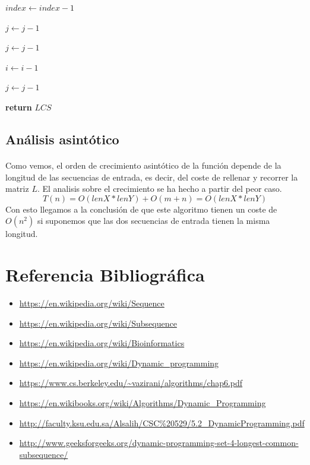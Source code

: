 \documentclass{article}
\begin{document}
\begin{algorithm}[H]
\begin{algorithmic}[1]
						\State $index\gets index - 1$
 				
						\State $j\gets j - 1$
 				
						\State $j\gets j - 1$

 				
						\State $i\gets i - 1$
				
					\Else
 				
						\State $j\gets j - 1$
				
					\EndIf
				
				\EndWhile
				
				\State

				\State \textbf{return} $LCS$

			\EndFunction
			
			\end{algorithmic}

		\end{algorithm}

	\subsection{Análisis asintótico}
		\paragraph{}
		Como vemos, el orden de crecimiento asintótico de la función depende de la longitud de las secuencias de entrada, es decir, del coste de rellenar y recorrer la matriz $L$. El analisis sobre el crecimiento se ha hecho a partir del peor caso.
		\[
		T(n) = O(lenX*lenY) + O(m+n) = O(lenX*lenY)
		\]
		Con esto llegamos a la conclusión de que este algoritmo tienen un coste de $O(n^2)$ si suponemos que las dos secuencias de entrada tienen la misma longitud.
		
	\section{Referencia Bibliográfica}

		\begin{itemize}
			\item \url{https://en.wikipedia.org/wiki/Sequence}
			\item \url{https://en.wikipedia.org/wiki/Subsequence}
			\item \url{https://en.wikipedia.org/wiki/Bioinformatics}
			\item \url{https://en.wikipedia.org/wiki/Dynamic_programming}
			\item \url{https://www.cs.berkeley.edu/~vazirani/algorithms/chap6.pdf}
			\item \url{https://en.wikibooks.org/wiki/Algorithms/Dynamic_Programming}
			\item \url{http://faculty.ksu.edu.sa/Alsalih/CSC%20529/5.2_DynamicProgramming.pdf}
			\item \url{http://www.geeksforgeeks.org/dynamic-programming-set-4-longest-common-subsequence/}

		\end{itemize}
\end{document}
